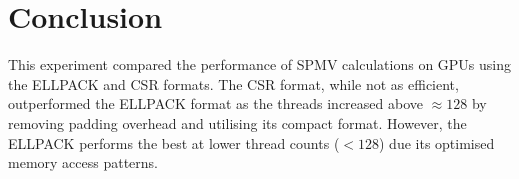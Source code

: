 \documentclass[conference]{IEEEtran}
\begin{document}
\section{Conclusion}
This experiment compared the performance of SPMV calculations on GPUs using the ELLPACK and CSR formats.
The CSR format, while not as efficient, outperformed the ELLPACK format as the threads increased above $\approx128$ by removing padding overhead and utilising its compact format.
However, the ELLPACK performs the best at lower thread counts ($<128$) due its optimised memory access patterns.
\end{document}
